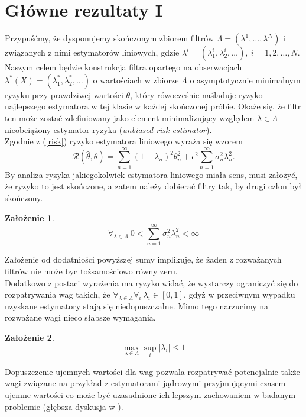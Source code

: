 \documentclass{article}
\newtheorem{za}{Założenie}
\begin{document}
\section{Główne rezultaty I}
Przypuśćmy, że dysponujemy skończonym zbiorem filtrów $\Lambda=(\lambda^1,\dots, \lambda^N)$ i związanych z nimi estymatorów liniowych, gdzie $\lambda^i=(\lambda^i_1,\lambda^i_2,\dots),\ i=1,2,\dots, N$. Naszym celem będzie konstrukcja filtra opartego na obserwacjach $\lambda^*(X)=(\lambda^*_1,\lambda^*_2,\dots)$ o wartościach w zbiorze $\Lambda$ o asymptotycznie minimalnym ryzyku przy prawdziwej wartości $\theta$, który rówocześnie naśladuje ryzyko najlepszego estymatora w tej klasie w każdej skończonej próbie. Okaże się, że filtr ten może zostać zdefiniowany jako element minimalizujący względem $\lambda \in \Lambda$ nieobciążony estymator ryzyka (\textit{unbiased risk estimator}).\\
Zgodnie z (\ref{risk}) ryzyko estymatora liniowego wyraża się wzorem
\begin{displaymath}
\mathcal{R}(\hat{\theta},\theta)=\sum_{n=1}^{\infty}(1-\lambda_n)^2\theta_n^2+\epsilon^2\sum_{n=1}^{\infty}\sigma_n^2\lambda_n^2.
\end{displaymath}
By analiza ryzyka jakiegokolwiek estymatora liniowego miała sens, musi założyć, że ryzyko to jest skończone, a zatem należy dobierać filtry tak, by drugi człon był skończony.
\begin{za}
\begin{displaymath}\label{ass1}
\forall_{\lambda\in \Lambda}\ 0<\sum_{n=1}^{\infty}\sigma_n^2\lambda_n^2<\infty
\end{displaymath}
\end{za}
Założenie od dodatniości powyższej sumy implikuje, że żaden z rozważanych filtrów nie może byc tożsamościowo równy zeru.\\
Dodatkowo z postaci wyrażenia ma ryzyko widać, że wystarczy ograniczyć się do rozpatrywania wag takich, że $\forall_{\lambda\in \Lambda}\forall_i\ \lambda_i\in [0,1]$, gdyż w przeciwnym wypadku uzyskane estymatory stają się niedopuszczalne. Mimo tego narzucimy na rozważane wagi nieco słabsze wymagania.
\begin{za}
\begin{displaymath}\label{ass2}
\max_{\lambda\in \Lambda}\sup_i|\lambda_i|\leq 1
\end{displaymath}
\end{za}
Dopuszczenie ujemnych wartości dla wag pozwala rozpatrywać potencjalnie także wagi związane na przykład z estymatorami jądrowymi przyjmującymi czasem ujemne wartości co może być uzasadnione ich lepszym zachowaniem w badanym problemie (głębsza dyskusja w \cite{silverman}).\\
\end{document}
